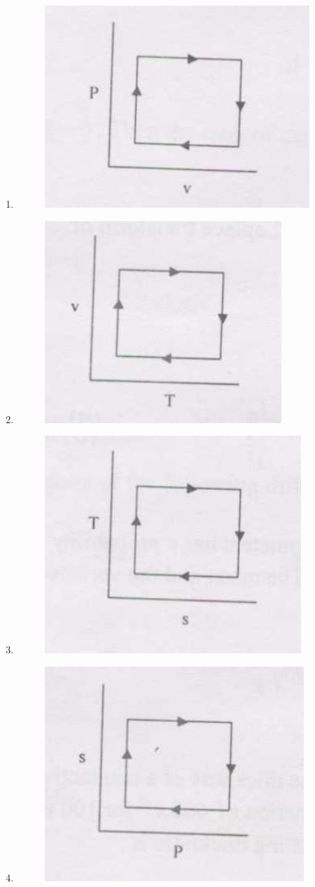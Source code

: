\documentclass[journal,12pt,onecolumn]{IEEEtran}
\theoremstyle{remark}
\begin{document}
\begin{enumerate}
\begin{multicols}{2}
    \begin{enumerate}
        \item \begin{figure}[H]
        \includegraphics[width=0.4\linewidth]{figs/32a.png}
            \label{fig:32a}
        \end{figure}

        \item \begin{figure}[H]
        \includegraphics[width=0.4\linewidth]{figs/32b.png}
            \label{fig:32b}
        \end{figure}

        \item \begin{figure}[H]
        \includegraphics[width=0.4\linewidth]{figs/32c.png}
            \label{fig:32c}
        \end{figure}

        \item \begin{figure}[H]
        \includegraphics[width=0.4\linewidth]{figs/32d.png}
            \label{fig:32d}
        \end{figure}


\end{enumerate}
\end{multicols}
\end{enumerate}
\end{document}
